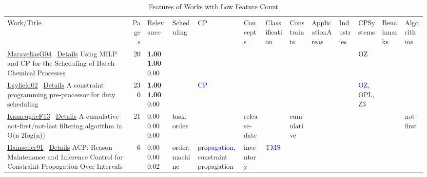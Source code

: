 {\scriptsize
\begin{longtable}{>{\raggedright\arraybackslash}p{3cm}r>{\raggedright\arraybackslash}p{1.0cm}>{\raggedright\arraybackslash}p{ 1.50cm}>{\raggedright\arraybackslash}p{ 1.50cm}>{\raggedright\arraybackslash}p{ 1.50cm}>{\raggedright\arraybackslash}p{ 1.50cm}>{\raggedright\arraybackslash}p{ 1.50cm}>{\raggedright\arraybackslash}p{ 1.50cm}>{\raggedright\arraybackslash}p{ 1.50cm}>{\raggedright\arraybackslash}p{ 1.50cm}>{\raggedright\arraybackslash}p{ 1.50cm}>{\raggedright\arraybackslash}p{ 1.50cm}}
\rowcolor{white}\caption{Features of Works with Low Feature Count}\\ \toprule
\rowcolor{white}Work/Title & Pages & Relevance & Scheduling& CP& Concepts& Classification& Constraints& ApplicationAreas& Industries& CPSystems& Benchmarks& Algorithms\\ \midrule\endhead
\bottomrule
\endfoot
\href{../works/MaraveliasG04.pdf}{MaraveliasG04}~\cite{MaraveliasG04} \hyperref[detail:MaraveliasG04]{Details} Using {MILP} and {CP} for the Scheduling of Batch Chemical Processes & 20 & \noindent{}\textbf{1.00} \textbf{1.00} \textcolor{black!50}{0.00} &  &  &  &  &  &  &  & \textcolor{black}{OZ} &  & \\
\href{../works/Layfield02.pdf}{Layfield02}~\cite{Layfield02} \hyperref[detail:Layfield02]{Details} A constraint programming pre-processor for duty scheduling & 230 & \noindent{}\textbf{1.00} \textbf{1.00} \textcolor{black!50}{0.00} &  & \textcolor{blue}{CP} &  &  &  &  &  & \textcolor{blue}{OZ}, \textcolor{black!40}{OPL}, \textcolor{black!40}{Z3} &  & \\
\href{../works/KameugneF13.pdf}{KameugneF13}~\cite{KameugneF13} \hyperref[detail:KameugneF13]{Details} A cumulative not-first/not-last filtering algorithm in O(n 2log(n)) & 21 & \noindent{}\textcolor{black!50}{0.00} \textcolor{black!50}{0.00} \textcolor{black!50}{0.00} & \textcolor{black}{task}, \textcolor{black!40}{order} &  & \textcolor{black!40}{release-date} &  & \textcolor{black!40}{cumulative} &  &  &  &  & \textcolor{black!40}{not-first}\\
\href{../works/Hamscher91.pdf}{Hamscher91}~\cite{Hamscher91} \hyperref[detail:Hamscher91]{Details} {ACP:} Reason Maintenance and Inference Control for Constraint Propagation Over Intervals & 6 & \noindent{}\textcolor{black!50}{0.00} \textcolor{black!50}{0.00} \textcolor{black!50}{0.02} & \textcolor{black!40}{order}, \textcolor{black!40}{machine} & \textcolor{blue}{propagation}, \textcolor{black!40}{constraint propagation} & \textcolor{black}{inventory} & \textcolor{blue}{TMS} &  &  &  &  &  & \\

\end{longtable}}
